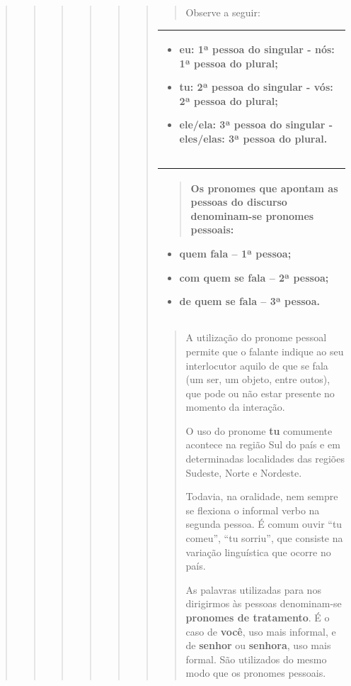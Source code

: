 \begin{quote}
\begin{quote}
\begin{quote}
\begin{quote}
\begin{quote}
\begin{quote}
\begin{quote}
Observe a seguir:
\end{quote}

\begin{longtable}[]{@{}l@{}}
\toprule
\begin{minipage}[t]{0.97\columnwidth}\raggedright\strut
\begin{itemize}
\item
  eu: 1ª pessoa do singular - nós: 1ª pessoa do plural;
\item
  tu: 2ª pessoa do singular - vós: 2ª pessoa do plural;
\item
  ele/ela: 3ª pessoa do singular - eles/elas: 3ª pessoa do plural.
\end{itemize}\strut
\end{minipage}\tabularnewline
\bottomrule
\end{longtable}

\begin{longtable}[]{@{}l@{}}
\toprule
\begin{minipage}[t]{0.97\columnwidth}\raggedright\strut
\begin{quote}
Os pronomes que apontam as pessoas do discurso denominam-se
\textbf{pronomes pessoais}:
\end{quote}

\begin{itemize}
\item
  quem fala -- 1ª pessoa;
\item
  com quem se fala -- 2ª pessoa;
\item
  de quem se fala -- 3ª pessoa.
\end{itemize}\strut
\end{minipage}\tabularnewline
\bottomrule
\end{longtable}

\begin{quote}
A utilização do pronome pessoal permite que o falante indique ao seu
interlocutor aquilo de que se fala (um ser, um objeto, entre outos), que
pode ou não estar presente no momento da interação.

O uso do pronome \textbf{tu} comumente acontece na região Sul do país e
em determinadas localidades das regiões Sudeste, Norte e Nordeste.

Todavia, na oralidade, nem sempre se flexiona o informal verbo na
segunda pessoa. É comum ouvir ``tu comeu'', ``tu sorriu'', que consiste
na variação linguística que ocorre no país.

As palavras utilizadas para nos dirigirmos às pessoas denominam-se
\textbf{pronomes de tratamento}. É o caso de \textbf{você}, uso mais
informal, e de \textbf{senhor} ou \textbf{senhora}, uso mais formal. São
utilizados do mesmo modo que os pronomes pessoais.
\end{quote}


\end{quote}
\end{quote}
\end{quote}
\end{quote}
\end{quote}
\end{quote}
